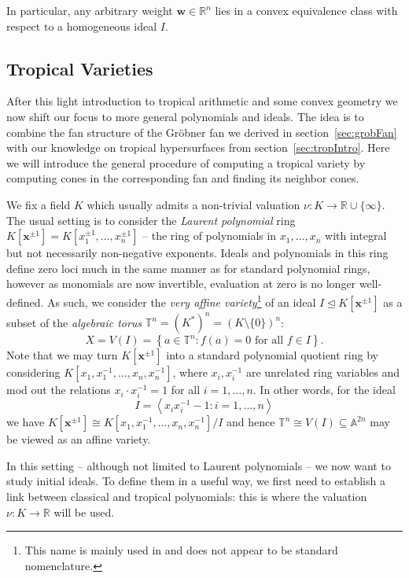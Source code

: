 \documentclass[
  paper=a4,
  titlepage,
  bibliography=totoc,
  pagesize=pdftex
]{scrartcl}
\numberwithin{figure}{section}
\numberwithin{equation}{section}
\numberwithin{table}{section}
\newcommand*\setR{\mathds{R}}
\newcommand*\setA{\mathds{A}}
\newcommand*\setT{\mathds{T}}
\newcommand*\ideal[1]{\left\langle #1 \right\rangle}
\let\vec\mathbf
\let\idealof\trianglelefteq
\theoremstyle{definition}
\numberwithin{definition}{section}
\begin{document}
In particular, any arbitrary weight $\vec w \in \setR^n$ lies in a convex equivalence
class with respect to a homogeneous ideal $I$.

\subsection{Tropical Varieties}
\label{sec:tropVar}

After this light introduction to tropical arithmetic and some convex geometry we now shift
our focus to more general polynomials and ideals. The idea is to combine the fan structure
of the Gröbner fan we derived in section~\ref{sec:grobFan} with our knowledge on tropical
hypersurfaces from section~\ref{sec:tropIntro}. Here we will introduce the general
procedure of computing a tropical variety by computing cones in the corresponding fan and
finding its neighbor cones.

We fix a field $K$ which usually admits a non-trivial valuation $\nu : K \to \setR \cup
\{\infty\}$. The usual setting is to consider the \emph{Laurent polynomial} ring $K[\vec
x^{\pm1}] = K[x_1^{\pm1}, \dots, x_n^{\pm1}]$ -- the ring of polynomials in $x_1, \dots,
x_n$ with integral but not necessarily non-negative exponents. Ideals and polynomials in
this ring define zero loci much in the same manner as for standard polynomial rings,
however as monomials are now invertible, evaluation at zero is no longer well-defined. As
such, we consider the \emph{very affine variety}\footnote{This name is mainly used in
\cite{sturmMacTrop} and does not appear to be standard nomenclature.} of an ideal $I
\idealof K[\vec x^{\pm1}]$ as a subset of the \emph{algebraic torus} $\setT^n = {(K^*)}^n
= {(K \setminus \{0\})}^n$:
\[
  X = V(I) = \left\{ a \in \setT^n : f(a) = 0 \text{ for all $f \in I$} \right\}.
\]
Note that we may turn $K[\vec x^{\pm1}]$ into a standard polynomial quotient ring by
considering $K[x_1,x_1^{-1}, \dots, x_n,x_n^{-1}]$, where $x_i, x_i^{-1}$ are unrelated
ring variables and mod out the relations $x_i\cdot x_i^{-1} = 1$ for all $i=1,\dots,n$.
In other words, for the ideal
\[
  I = \ideal{ x_ix_i^{-1}-1 : i = 1, \dots, n}
\]
we have $K[\vec x^{\pm1}] \cong K[x_1,x_1^{-1}, \dots, x_n,x_n^{-1}]/I$ and hence $\setT^n
\cong V(I) \subseteq \setA^{2n}$ may be viewed as an affine variety.

In this setting -- although not limited to Laurent polynomials -- we now want to study
initial ideals. To define them in a useful way, we first need to establish a link between
classical and tropical polynomials: this is where the valuation $\nu:K\to\setR$ will be
used.
\end{document}
